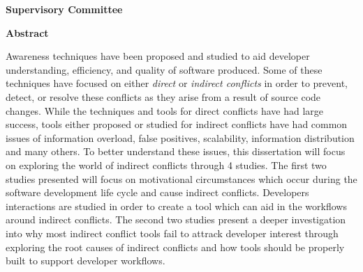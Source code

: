 \newpage
{}

\noindent \textbf{Supervisory Committee}
\tpbreak
\panel

\begin{center}
\textbf{Abstract}
\end{center}

Awareness techniques have been proposed and studied to aid developer
understanding, efficiency, and quality of software produced. Some of these techniques have focused
on either \textit{direct} or
\textit{indirect conflicts} in order to prevent, detect, or resolve these conflicts as they arise
from a result of source code changes. While the techniques and tools for direct conflicts have had
large success, tools either proposed or studied for indirect conflicts have had common issues of
information overload, false positives, scalability, information distribution and many others.
To better understand these issues, this dissertation will focus on exploring the world of indirect conflicts
through 4 studies. The first two studies presented will focus on motivational circumstances which occur
during the software development life cycle and cause indirect conflicts. Developers interactions are
studied in order to create a tool which can aid in the workflows around indirect conflicts. The second
two studies present a deeper investigation into why most indirect conflict tools fail to attrack developer
interest through exploring the root causes of indirect conflicts and how tools should be properly built
to support developer workflows.
